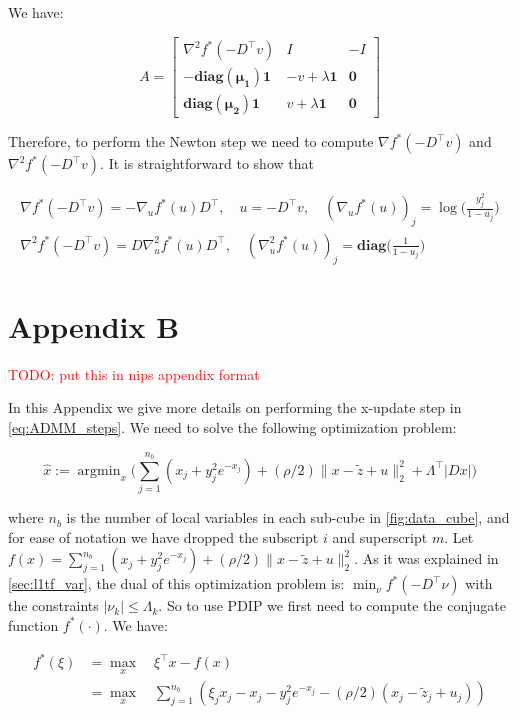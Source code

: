 \documentclass{article}
\DeclareMathOperator*{\argmin}{argmin}
\newcommand{\attn}[1]{\textcolor{red}{TODO: #1}}
\newcommand{\one}{\mathbf{1}}
\begin{document}
We have:

\begin{equation}
A=
\begin{bmatrix}
	\nabla^2 f^*(-D^\top v) & I & -I\\
	-\mathbf{diag(\mu_1)}\one & -v+\lambda\one & \mathbf{0}\\
	\mathbf{diag(\mu_2)}\one & v+\lambda\one & \mathbf{0}
	\end{bmatrix}
\label{eq:delta_r}
\end{equation}

Therefore, to perform the Newton step we need to compute $\nabla f^*(-D^\top v)$ and $\nabla^2 f^*(-D^\top v)$. It is straightforward to show that

\begin{align}
\nabla f^*(-D^\top v) = -\nabla_u f^*(u) D^\top ,\quad u=-D^\top v, \quad (\nabla_u f^*(u))_j=\log\bigg(\frac{y_j^2}{1-u_j}\bigg) \\
\nabla^2 f^*(-D^\top v)=D\nabla_u^2 f^*(u)D^\top, \quad (\nabla_u^2 f^*(u))_j=\mathbf{diag}\bigg(\frac{1}{1-u_j}\bigg)
\end{align}


\section{Appendix B}
\label{sec:app_consADMM}
\attn{put this in nips appendix format}

In this Appendix we give more details on performing the x-update step in \autoref{eq:ADMM_steps}. We need to solve the following optimization problem:

\begin{equation}
\hat{x}:=\argmin_{x} \bigg( \sum_{j=1}^{n_b} (x_j + y_j^2e^{-x_j}) + (\rho/2) \lVert x-\tilde{z} + u \lVert_2^2 + \Lambda^\top |D x| \bigg)
\label{eq:x_update_opt}
\end{equation}

\noindent where $n_b$ is the number of local variables in each sub-cube in \autoref{fig:data_cube}, and for ease of notation we have dropped the subscript $i$ and superscript $m$. Let $f(x)=\sum_{j=1}^{n_b} (x_j + y_j^2e^{-x_j}) + (\rho/2) \lVert x-\tilde{z} + u \lVert_2^2$. As it was explained in \autoref{sec:l1tf_var}, the dual of this optimization problem is: $\min_\nu f^*(-D^\top\nu)$ with the constraints $|\nu_k| \le \Lambda_k$. So to use PDIP we first need to compute the conjugate function $f^*(\cdot)$. We have:


\begin{align}
f^*(\xi) & = \max_x \quad \xi^\top x - f(x)\\
& =  \max_x \quad \sum_{j=1}^{n_b} (\xi_jx_j - x_j - y_j^2e^{-x_j} - (\rho/2)(x_j-\tilde{z}_j+u_j))
\label{eq:conjugate}
\end{align}
\end{document}
